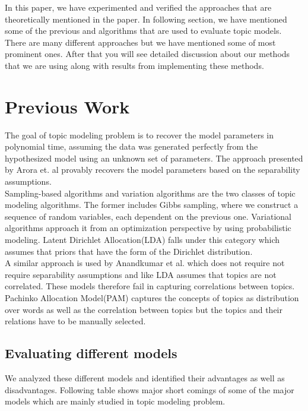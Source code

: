 \documentclass[a4paper,11pt]{article}
\begin{document}
In this paper, we have experimented and verified the approaches that are theoretically mentioned in the paper. In following section, we have mentioned some of the previous and algorithms that are used to evaluate topic models. There are many different approaches but we have mentioned some of most prominent ones. After that you will see detailed discussion about our methods that we are using along with results from implementing these methods. \\

\section{Previous Work}

The goal of topic modeling problem is to recover the model parameters in polynomial time, assuming the data was generated perfectly from the hypothesized model using an unknown set of parameters. The approach presented by Arora et. al \cite{tm} provably recovers the model parameters based on the separability assumptions. \\

Sampling-based algorithms and variation algorithms are the two classes of topic modeling algorithms. The former includes Gibbs sampling, where we construct a sequence of random variables, each dependent on the previous one. Variational algorithms approach it from an optimization perspective by using probabilistic modeling\cite{blei}. Latent Dirichlet Allocation(LDA) falls under this category which assumes that priors that have the form of the Dirichlet distribution.\\ 

A similar approach is used by Anandkumar et al\cite{anand12}. which does not require not require separability assumptions and like LDA assumes that topics are not correlated. These models therefore fail in capturing correlations between topics. Pachinko Allocation Model(PAM) captures the concepts of topics as distribution over words as well as the correlation between topics but the topics and their relations have to be manually selected\cite{pam}.

\subsection{Evaluating different models}
We analyzed these different models and identified their advantages as well as disadvantages. Following table shows major short comings of some of the major models which are mainly studied in topic modeling problem.
\end{document}
